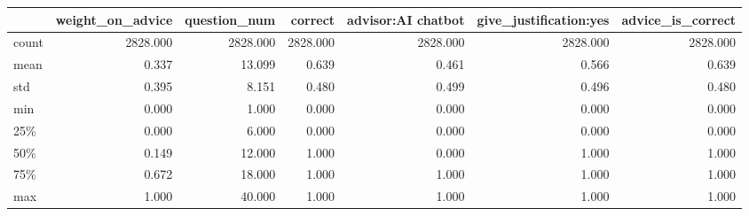 \begin{tabular}{lrrrrrr}
\toprule
{} &  weight\_on\_advice &  question\_num &   correct &  advisor:AI chatbot &  give\_justification:yes &  advice\_is\_correct \\
\midrule
count &          2828.000 &      2828.000 &  2828.000 &            2828.000 &                2828.000 &           2828.000 \\
mean  &             0.337 &        13.099 &     0.639 &               0.461 &                   0.566 &              0.639 \\
std   &             0.395 &         8.151 &     0.480 &               0.499 &                   0.496 &              0.480 \\
min   &             0.000 &         1.000 &     0.000 &               0.000 &                   0.000 &              0.000 \\
25\%   &             0.000 &         6.000 &     0.000 &               0.000 &                   0.000 &              0.000 \\
50\%   &             0.149 &        12.000 &     1.000 &               0.000 &                   1.000 &              1.000 \\
75\%   &             0.672 &        18.000 &     1.000 &               1.000 &                   1.000 &              1.000 \\
max   &             1.000 &        40.000 &     1.000 &               1.000 &                   1.000 &              1.000 \\
\bottomrule
\end{tabular}

